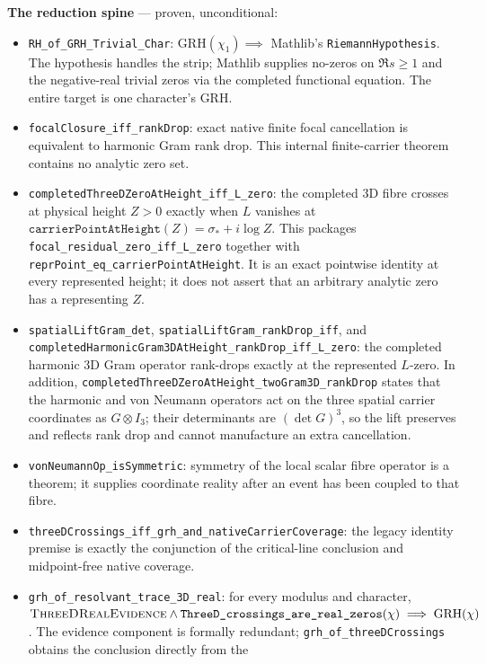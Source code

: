 \medskip
\noindent\textbf{The reduction spine} --- proven, unconditional:
\begin{itemize}
\item \texttt{RH\_of\_GRH\_Trivial\_Char}: \(\mathrm{GRH}(\chi_1)\implies\)
Mathlib's \texttt{RiemannHypothesis}. The hypothesis handles the strip;
Mathlib supplies no-zeros on \(\Re s\ge1\) and the negative-real trivial
zeros via the completed functional equation. The entire target is one
character's GRH.
\item \texttt{focalClosure\_iff\_rankDrop}: exact native finite focal
cancellation is equivalent to harmonic Gram rank drop.  This internal
finite-carrier theorem contains no analytic zero set.
\item \texttt{completedThreeDZeroAtHeight\_iff\_L\_zero}: the completed
3D fibre crosses at physical height \(Z>0\) exactly when \(L\) vanishes at
\(\texttt{carrierPointAtHeight}(Z)=\sigma_*+i\log Z\).  This packages
\texttt{focal\_residual\_zero\_iff\_L\_zero} together with
\texttt{reprPoint\_eq\_carrierPointAtHeight}.  It is an exact pointwise
identity at every represented height; it does not assert that an arbitrary
analytic zero has a representing \(Z\).
\item \texttt{spatialLiftGram\_det},
\texttt{spatialLiftGram\_rankDrop\_iff}, and
\texttt{completedHarmonicGram3DAtHeight\allowbreak\_rankDrop\allowbreak\_iff\allowbreak\_L\allowbreak\_zero}: the
completed harmonic 3D Gram operator rank-drops exactly at the represented
\(L\)-zero.  In addition,
\texttt{completedThreeDZeroAtHeight\_twoGram3D\_rankDrop} states that the harmonic and
von Neumann operators act on the three spatial carrier coordinates as
\(G\otimes I_3\); their determinants are \((\det G)^3\), so the lift
preserves and reflects rank drop and cannot manufacture an extra
cancellation.
\item \texttt{vonNeumannOp\_isSymmetric}: symmetry of the local scalar fibre
operator is a theorem; it supplies coordinate reality after an event has
been coupled to that fibre.
\item \texttt{threeDCrossings\_iff\_grh\_and\_nativeCarrierCoverage}: the
legacy identity premise is exactly the conjunction of the critical-line
conclusion and midpoint-free native coverage.
\item \texttt{grh\_of\_resolvant\_trace\_3D\_real}: for every modulus and
character, \(\textsc{ThreeDRealEvidence}\wedge
\texttt{ThreeD\_crossings\_are\_real\_zeros}(\chi)\implies
\mathrm{GRH}(\chi)\). The evidence component is formally redundant;
\texttt{grh\_of\_threeDCrossings} obtains the conclusion directly from the

\end{itemize}
